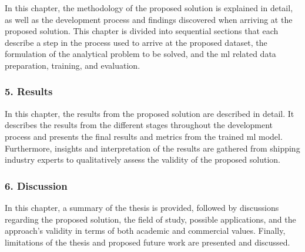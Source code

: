 In this chapter, the methodology of the proposed solution is explained in detail, as well as the development process and findings discovered when arriving at the proposed solution. This chapter is divided into sequential sections that each describe a step in the process used to arrive at the proposed dataset, the formulation of the analytical problem to be solved, and the \acrfull{ml} related data preparation, training, and evaluation.

\subsubsection{5. Results}

In this chapter, the results from the proposed solution are described in detail. It describes the results from the different stages throughout the development process and presents the final results and metrics from the trained \acrfull{ml} model. Furthermore, insights and interpretation of the results are gathered from shipping industry experts to qualitatively assess the validity of the proposed solution.

\subsubsection{6. Discussion}

In this chapter, a summary of the thesis is provided, followed by discussions regarding the proposed solution, the field of study, possible applications, and the approach's validity in terms of both academic and commercial values. Finally, limitations of the thesis and proposed future work are presented and discussed.
